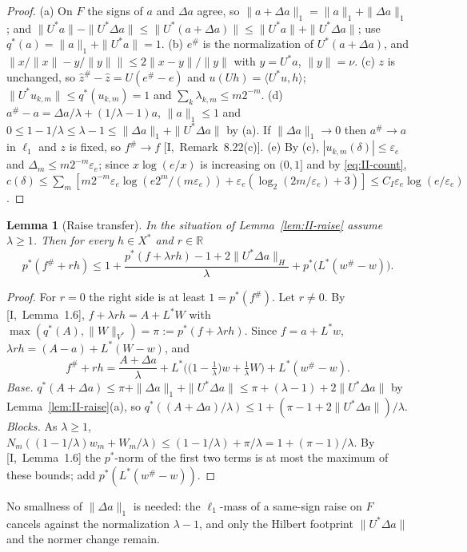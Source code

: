 \documentclass[10pt]{amsart}
\newtheorem{lemma}[theorem]{Lemma}
\theoremstyle{definition}
\theoremstyle{remark}
\newcommand{\R}{\mathbb R}
\newcommand{\zh}{\hat z}
\newcommand{\ip}[2]{\langle #1,#2\rangle}
\begin{document}
\begin{proof}
(a) On $F$ the signs of $a$ and $\Delta a$ agree, so $\|a+\Delta a\|_1=\|a\|_1+
\|\Delta a\|_1$; and $\|U^*a\|-\|U^*\Delta a\|\le\|U^*(a+\Delta a)\|\le
\|U^*a\|+\|U^*\Delta a\|$; use $q^*(a)=\|a\|_1+\|U^*a\|=1$.  (b) $e^\#$ is
the normalization of $U^*(a+\Delta a)$, and $\|x/\|x\|-y/\|y\|\|\le2\|x-y\|/
\|y\|$ with $y=U^*a$, $\|y\|=\nu$.  (c) $z$ is unchanged, so $\zh^\#-\zh=
U(e^\#-e)$ and $u(Uh)=\ip{U^*u}h$; $\|U^*u_{k,m}\|\le q^*(u_{k,m})=1$ and
$\sum_k\lambda_{k,m}\le m2^{-m}$.  (d) $a^\#-a=\Delta a/\lambda+(1/\lambda-1)
a$, $\|a\|_1\le1$ and $0\le1-1/\lambda\le\lambda-1\le\|\Delta a\|_1+\|U^*\Delta
a\|$ by (a).  If $\|\Delta a\|_1\to0$ then $a^\#\to a$ in $\ell_1$ and $z$ is
fixed, so $f^\#\to f$ [I,~Remark~8.22(c)].  (e) By (c), $|u_{k,m}(\delta)|\le
\varepsilon_e$ and $\Delta_m\le m2^{-m}\varepsilon_e$; since $x\log(e/x)$ is
increasing on $(0,1]$ and by \eqref{eq:II-count},
$c(\delta)\le\sum_m[m2^{-m}\varepsilon_e\log(e2^m/(m\varepsilon_e))+
\varepsilon_e(\log_2(2m/\varepsilon_e)+3)]\le C_I\varepsilon_e\log(e/
\varepsilon_e)$.
\end{proof}

\begin{lemma}[Raise transfer]\label{lem:II-RT}
In the situation of Lemma~\textup{\ref{lem:II-raise}} assume $\lambda\ge1$.
Then for every $h\in X^*$ and $r\in\R$
\[
 p^*(f^\#+rh)\le1+\frac{p^*(f+\lambda rh)-1+2\|U^*\Delta a\|_H}\lambda+
 p^*\big(L^*(w^\#-w)\big).
\]
\end{lemma}

\begin{proof}
For $r=0$ the right side is at least $1=p^*(f^\#)$.  Let $r\ne0$.  By
[I,~Lemma~1.6], $f+\lambda rh=A+L^*W$ with $\max(q^*(A),\|W\|_{V^*})=\pi:=
p^*(f+\lambda rh)$.  Since $f=a+L^*w$, $\lambda rh=(A-a)+L^*(W-w)$, and
\[
 f^\#+rh=\frac{A+\Delta a}\lambda+L^*\Big(\big(1-\tfrac1\lambda\big)w+
 \tfrac1\lambda W\Big)+L^*(w^\#-w).
\]
\emph{Base.}  $q^*(A+\Delta a)\le\pi+\|\Delta a\|_1+\|U^*\Delta a\|\le\pi+
(\lambda-1)+2\|U^*\Delta a\|$ by Lemma~\ref{lem:II-raise}(a), so
$q^*((A+\Delta a)/\lambda)\le1+(\pi-1+2\|U^*\Delta a\|)/\lambda$.
\emph{Blocks.}  As $\lambda\ge1$, $N_m((1-1/\lambda)w_m+W_m/\lambda)\le
(1-1/\lambda)+\pi/\lambda=1+(\pi-1)/\lambda$.  By [I,~Lemma~1.6] the
$p^*$-norm of the first two terms is at most the maximum of these bounds;
add $p^*(L^*(w^\#-w))$.
\end{proof}

No smallness of $\|\Delta a\|_1$ is needed: the $\ell_1$-mass of a same-sign
raise on $F$ cancels against the normalization $\lambda-1$, and only the
Hilbert footprint $\|U^*\Delta a\|$ and the normer change remain.
\end{document}
